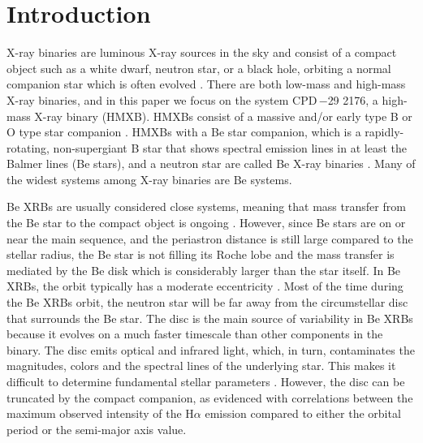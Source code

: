 \documentclass[]{aastex631}
\newcommand{\target}{CPD\,$-$29 2176}
\begin{document}





\section{Introduction} \label{sec:intro}

X-ray binaries are luminous X-ray sources in the sky and consist of a compact object such as a white dwarf, neutron star, or a black hole, orbiting a normal companion star which is often evolved \citep{Biswajit2011}. There are both low-mass and high-mass X-ray binaries, and in this paper we focus on the system \target, a high-mass X-ray binary (HMXB). HMXBs consist of a massive and/or early type B or O type star companion \citep{Reig2011}. HMXBs with a Be star companion, which is a rapidly-rotating, non-supergiant B star that shows spectral emission lines in at least the Balmer lines (Be stars), and a neutron star are called Be X-ray binaries \citep[Be XRBs; ][]{2019IAUS..346..105R}. Many of the widest systems among X-ray binaries are Be systems.


Be XRBs are usually considered close systems, meaning that mass transfer from the Be star to the compact object is ongoing \citep{Reig2011}. However, since Be stars are on or near the main sequence, and the periastron distance is still large compared to the stellar radius, the Be star is not filling its Roche lobe and the mass transfer is mediated by the Be disk which is considerably larger than the star itself. In Be XRBs, the orbit typically has a moderate eccentricity \citep[e.g.,][]{Biswajit2011}. Most of the time during the Be XRBs orbit, the neutron star will be far away from the circumstellar disc that surrounds the Be star. The disc is the main source of variability in Be XRBs because it evolves on a much faster timescale than other components in the binary. The disc emits optical and infrared light, which, in turn, contaminates the magnitudes, colors and the spectral lines of the underlying star. This makes it difficult to determine fundamental stellar parameters \citet{P.Reig2016}. However, the disc can be truncated by the compact companion, as evidenced with correlations between the maximum observed intensity of the H$\alpha$ emission compared to either the orbital period \citep{2007MNRAS.377..867R,2009ApJ...707.1080A} or the semi-major axis value.
\end{document}
